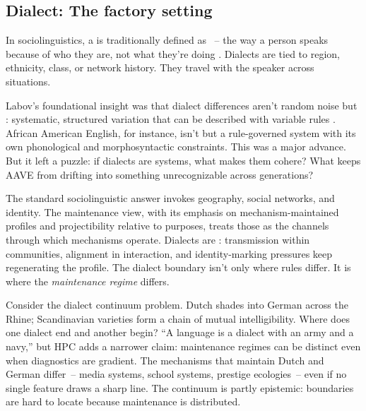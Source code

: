 \subsection{Dialect: The factory setting}
\label{sec:16:dialect}

In sociolinguistics, a  is traditionally defined as ~-- the way a person speaks because of who they are, not what they're doing \citep{halliday1978}. Dialects are tied to region, ethnicity, class, or network history. They travel with the speaker across situations.

Labov's foundational insight was that dialect differences aren't random noise but : systematic, structured variation that can be described with variable rules \citep{labov1972}. African American English, for instance, isn't  but a rule-governed system with its own phonological and morphosyntactic constraints. This was a major advance. But it left a puzzle: if dialects are systems, what makes them cohere? What keeps AAVE from drifting into something unrecognizable across generations?

The standard sociolinguistic answer invokes geography, social networks, and identity. The maintenance view, with its emphasis on mechanism-maintained profiles and projectibility relative to purposes, treats those as the channels through which mechanisms operate. Dialects are : transmission within communities, alignment in interaction, and identity-marking pressures keep regenerating the profile. The dialect boundary isn't only where rules differ. It is where the \emph{maintenance regime} differs.

Consider the dialect continuum problem. Dutch shades into German across the Rhine; Scandinavian varieties form a chain of mutual intelligibility. Where does one dialect end and another begin? \enquote{A language is a dialect with an army and a navy,} but HPC adds a narrower claim: maintenance regimes can be distinct even when diagnostics are gradient. The mechanisms that maintain Dutch and German differ~-- media systems, school systems, prestige ecologies~-- even if no single feature draws a sharp line. The continuum is partly epistemic: boundaries are hard to locate because maintenance is distributed.

